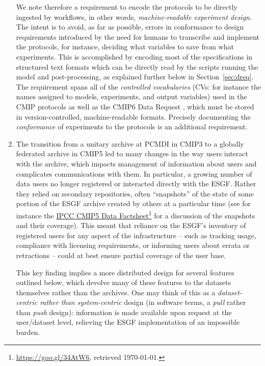 \documentclass[gmd,manuscript]{copernicus}
\newcommand{\pllabel}[1]{\label{p-#1}\linelabel{l-#1}}
\newcommand{\urlref}[2] {\href{#1}{#2}\footnote{\url{#1}, retrieved \today.}}
\begin{document}
\begin{enumerate}
  We note therefore a requirement to encode the protocols to be
  directly ingested by workflows, in other words,
  \emph{machine-readable experiment design}.
  \pllabel{RC1-14}
  The intent is to avoid, as far as possible, errors in conformance to
  design requirements introduced by the need for humans to transcribe
  and implement the protocols, for instance, deciding what variables
  to save from what experiments. This is accomplished by encoding most
  of the specifications in structured text formats which can be
  directly read by the scripts running the model and post-processing,
  as explained further below in Section~\ref{sec:dreq}. The
  requirement spans all of the \emph{controlled vocabularies} (CVs:
  for instance the names assigned to models, experiments, and output
  variables) used in the CMIP protocols as well as the CMIP6 Data
  Request \citep{ref:juckesetal2015}, which must be stored in
  version-controlled, machine-readable formats. Precisely documenting
  the \emph{conformance} of experiments to the protocols
  \citep{ref:lawrenceetal2012} is an additional requirement.
\item\label{snap} The transition from a unitary archive at PCMDI in
  CMIP3 to a globally federated archive in CMIP5 led to many changes
  in the way users interact with the archive, which impacts management
  of information about users and complicates communications with them.
  In particular, a growing number of data users no longer registered or
  interacted directly with the ESGF. Rather they relied on secondary
  repositories, often ``snapshots'' of the state of some portion of
  the ESGF archive created by others at a particular time (see for
  instance the \urlref{https://goo.gl/34AtW6}{IPCC CMIP5 Data
    Factsheet}
  \pllabel{RC1-15}
  for a discussion of the snapshots and their coverage). This meant
  that reliance on the ESGF's inventory of registered users for any
  aspect of the infrastructure -- such as tracking usage, compliance
  with licensing requirements, or informing users about errata or
  retractions -- could at best ensure partial coverage of the user
  base.

  This key finding implies a more distributed design for several
  features outlined below, which devolve many of these features to the
  datasets themselves rather than the archives. One may think of this
  as a \emph{dataset-centric rather than system-centric} design (in
  software terms, a \emph{pull} rather than \emph{push} design):
  information is made available upon request at the user/dataset
  level, relieving the ESGF implementation of an impossible burden.
\end{enumerate}
\end{document}
